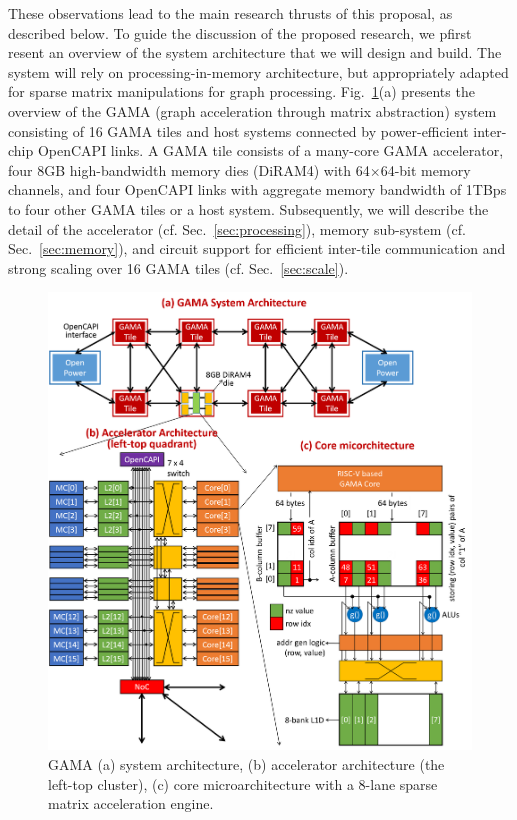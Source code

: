 These observations lead to the main research thrusts of this proposal, as described below. 
To guide the discussion of the proposed research, we pfirst resent an overview of the system architecture that we will design and build. 
The system will rely on processing-in-memory architecture, but appropriately adapted for sparse matrix manipulations for graph processing. 
Fig.~\ref{fig:arch}(a) presents the overview of the GAMA (graph acceleration through matrix abstraction) system consisting of 16 GAMA tiles and host systems connected by power-efficient inter-chip OpenCAPI links.
A GAMA tile consists of a many-core GAMA accelerator, four 8GB high-bandwidth memory dies (DiRAM4) with 64$\times$64-bit memory channels, 
and four OpenCAPI links with aggregate memory bandwidth of 1TBps to four other GAMA tiles or a host system.
Subsequently, we will describe the detail of the accelerator (cf. Sec.~\ref{sec:processing}),  memory sub-system (cf. Sec.~\ref{sec:memory}), and circuit support for efficient inter-tile communication and strong scaling over 16 GAMA tiles (cf. Sec.~\ref{sec:scale}).


\begin{figure}
\center
\includegraphics[width=1.0\linewidth]{fig/arch.png}
\caption{GAMA (a) system architecture, (b) accelerator architecture (the left-top cluster), (c) core microarchitecture with a 8-lane sparse matrix acceleration engine.}
\label{fig:arch}
\end{figure}


